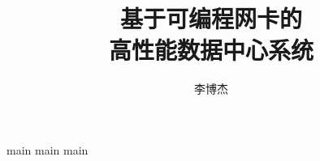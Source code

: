 \documentclass[doctor]{ustcthesis}
\title{基于可编程网卡的\\高性能数据中心系统}
\author{李博杰}
\begin{document}
%

\maketitle
\makestatement

\frontmatter

\tableofcontents
%

\mainmatter



{main}
{main}
{main}

%
%
%



%

\backmatter


\end{document}
